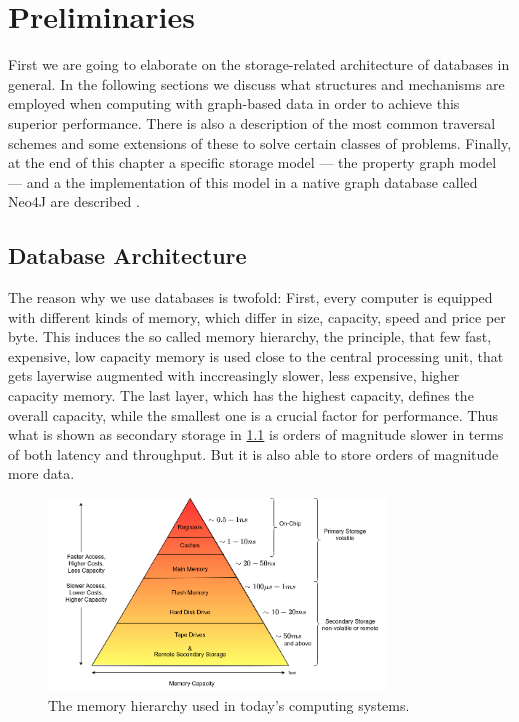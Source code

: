 \chapter{Preliminaries}\label{\positionnumber}
    First we are going to elaborate on the storage-related architecture of databases in general.
    In the following sections we discuss what structures and mechanisms are employed when computing with graph-based data in order to achieve this superior performance.
    There is also a description of the most common traversal schemes and some extensions of these to solve certain classes of problems.
    Finally, at the end of this chapter a specific storage model --- the property graph model --- and a the implementation of this model in a native graph database called Neo4J are described .

\section{Database Architecture}\label{db-arch}
    The reason why we use databases is twofold:
    First, every computer is equipped with different kinds of memory, which differ in size, capacity, speed and price per byte. 
    This induces the so called memory hierarchy, the principle, that few fast, expensive, low capacity memory is used close to the central processing unit, that gets layerwise augmented with inccreasingly slower, less expensive, higher capacity memory. 
    The last layer, which has the highest capacity, defines the overall capacity, while the smallest one is a crucial factor for performance.
    Thus what is shown as secondary storage in \ref{mem-hier} is orders of magnitude slower in terms of both latency and throughput.
    But it is also able to store orders of magnitude more data. 
    \begin{figure}[htp]
        \begin{center}
        \includegraphics[keepaspectratio,width=0.8\textwidth]{img/03-preliminaries/mem-hierarch.png}
        \end{center}
        \caption{The memory hierarchy used in today's computing systems.} 
        \label{mem-hier}
    \end{figure}
